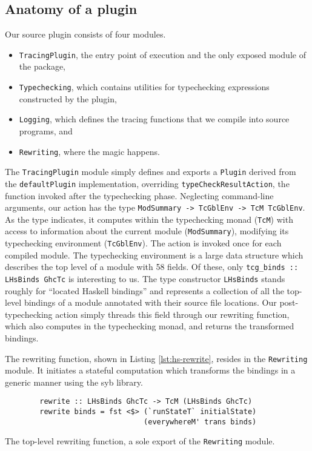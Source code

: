 \documentclass[thesis=B,english]{FITthesis}[2019/12/23]
\newcommand{\hsType}[1]{\texttt{#1}}
\newcommand{\hsIdent}[1]{\texttt{#1}}
\newcommand{\hsModule}[1]{\texttt{#1}}
\newcommand{\hsCode}[1]{\texttt{#1}}
\begin{document}
\subsection*{Anatomy of a plugin}
Our source plugin consists of four modules.
\begin{itemize}
	\item \hsModule{TracingPlugin}, the entry point of execution and the only
		exposed module of the package,
	\item \hsModule{Typechecking}, which contains utilities for typechecking
		expressions constructed by the plugin,
	\item \hsModule{Logging}, which defines the tracing functions that we
		compile into source programs, and
	\item \hsModule{Rewriting}, where the magic happens.
\end{itemize}

The \hsModule{TracingPlugin} module simply defines and exports a
\hsType{Plugin} derived from the \hsIdent{defaultPlugin} implementation,
overriding \hsIdent{typeCheckResultAction}, the function invoked after the
typechecking phase. Neglecting command-line arguments, our action has the type
\hsType{ModSummary -> TcGblEnv -> TcM TcGblEnv}. As the type indicates, it
computes within the typechecking monad (\hsType{TcM}) with access to
information about the current module (\hsType{ModSummary}), modifying its
typechecking environment (\hsType{TcGblEnv}). The action is invoked once for
each compiled module. The typechecking environment is a large data structure
which describes the top level of a module with 58 fields. Of these, only
\hsCode{tcg_binds :: LHsBinds GhcTc} is interesting to us. The type
constructor \hsType{LHsBinds} stands roughly for ``located Haskell bindings''
and represents a collection of all the top-level bindings of a module annotated
with their source file locations. Our post-typechecking action simply threads
this field through our rewriting function, which also computes in the
typechecking monad, and returns the transformed bindings.

The rewriting function, shown in Listing \ref{lst:hs-rewrite}, resides in the
\hsModule{Rewriting} module. It initiates a stateful computation which
transforms the bindings in a generic manner using the \acrshort{syb} library.
\begin{listing}[h]
	\centering
	\begin{verbatim}
        rewrite :: LHsBinds GhcTc -> TcM (LHsBinds GhcTc)
        rewrite binds = fst <$> (`runStateT` initialState)
                                (everywhereM' trans binds)
	\end{verbatim}
	\caption[The top-level rewriting function.]{The top-level rewriting
	function, a sole export of the \hsModule{Rewriting} module.}
	\label{lst:hs-rewrite}
\end{listing}
\end{document}
